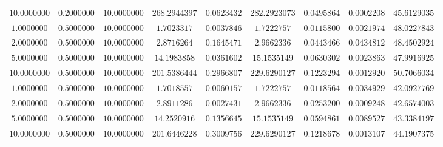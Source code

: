 \begin{tabular}{ccccccccc}
$10.0000000$ & $0.2000000$ & $10.0000000$ & $268.2944397$ & $0.0623432$ & $282.2923073$ & $0.0495864$ & $0.0002208$ & $45.6129035$\\
$1.0000000$ & $0.5000000$ & $10.0000000$ & $1.7023317$ & $0.0037846$ & $1.7222757$ & $0.0115800$ & $0.0021974$ & $48.0227843$\\
$2.0000000$ & $0.5000000$ & $10.0000000$ & $2.8716264$ & $0.1645471$ & $2.9662336$ & $0.0443466$ & $0.0434812$ & $48.4502924$\\
$5.0000000$ & $0.5000000$ & $10.0000000$ & $14.1983858$ & $0.0361602$ & $15.1535149$ & $0.0630302$ & $0.0023863$ & $47.9916925$\\
$10.0000000$ & $0.5000000$ & $10.0000000$ & $201.5386444$ & $0.2966807$ & $229.6290127$ & $0.1223294$ & $0.0012920$ & $50.7066034$\\
$1.0000000$ & $0.5000000$ & $10.0000000$ & $1.7018557$ & $0.0060157$ & $1.7222757$ & $0.0118564$ & $0.0034929$ & $42.0927769$\\
$2.0000000$ & $0.5000000$ & $10.0000000$ & $2.8911286$ & $0.0027431$ & $2.9662336$ & $0.0253200$ & $0.0009248$ & $42.6574003$\\
$5.0000000$ & $0.5000000$ & $10.0000000$ & $14.2520916$ & $0.1356645$ & $15.1535149$ & $0.0594861$ & $0.0089527$ & $43.3384197$\\
$10.0000000$ & $0.5000000$ & $10.0000000$ & $201.6446228$ & $0.3009756$ & $229.6290127$ & $0.1218678$ & $0.0013107$ & $44.1907375$\\
\end{tabular}
